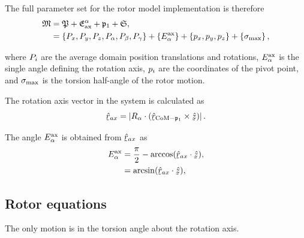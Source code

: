 The full parameter set for the rotor model implementation is therefore
\begin{subequations}
\begin{align}
    \mathfrak{M} &= \mathfrak{P} + \mathfrak{E}^\alpha_\textrm{ax} + \mathfrak{p}_1 + \mathfrak{S}, \\
              &= \left\{ P_x, P_y, P_z, P_\alpha, P_\beta, P_\gamma \right\} + \left\{ E_\alpha^{\textrm{ax}} \right\} + \left\{ p_x, p_y, p_z \right\} + \left\{ \sigma_\textrm{max} \right\},
\end{align}
\end{subequations}

where $P_i$ are the average domain position translations and rotations, $E_\alpha^{\textrm{ax}}$ is the single angle defining the rotation axis, $p_i$ are the coordinates of the pivot point, and $\sigma_\textrm{max}$ is the torsion half-angle of the rotor motion.

The rotation axis vector in the system is calculated as
\begin{equation}
    \raxhat = \left| R_\alpha \cdot (\rCoMpivhat \times \hat{\underaccent{\tilde}{z}}) \right| .
\end{equation}

The angle $E_\alpha^{\textrm{ax}}$ is obtained from $\raxhat$ as
\begin{subequations}
\begin{align}
    \frameaxa &= \frac{\pi}{2} - \arccos(\raxhat \cdot \hat{\underaccent{\tilde}{z}}), \\
              &= \arcsin(\raxhat \cdot \hat{\underaccent{\tilde}{z}}),
\end{align}
\end{subequations}


\subsection{Rotor equations}

The only motion is in the torsion angle about the rotation axis.

